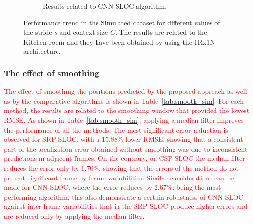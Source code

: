 \documentclass[review]{elsarticle}
\newcommand{\tableref}[1]{Table~\ref{#1}}
\begin{document}
\begin{figure}[t]
\begin{subfigure}{0.45\columnwidth}
%
	\caption{Results related to CNN-SLOC algorithm.}
		\end{subfigure}
	\caption{Performance trend in the Simulated dataset for different values of the stride $s$ and context size $C$. The results are related to the Kitchen room and they have been obtained by using the 1Rx1N architecture.}\label{sfig:cnn-real-context}
	\label{ctx-str-SIMU}
\end{figure}


\subsubsection{The effect of smoothing}
\textcolor{red}{
The effect of smoothing the positions predicted by the proposed approach as well as by the comparative algorithms is shown in \tableref{tab:smooth_sim}. For each method, the results are related to the smoothing window that provided the lowest RMSE. As shown in \tableref{tab:smooth_sim}, applying a median filter improves the performance of all the methods. The most significant error reduction is observed for SRP-SLOC, with a 15.88\% lower RMSE, showing that a consistent part of the localization error obtained without smoothing was due to inconsistent predictions in adjacent frames. On the contrary, on CSP-SLOC the median filter reduces the error only by 1.70\%, showing that the errors of the method do not present significant frame-by-frame variabilities. Similar considerations can be made for CNN-SLOC, where the error reduces by 2.67\%: being the most performing algorithm, this also demonstrate a certain robustness of CNN-SLOC against inter-frame variabilities that in the SRP-SLOC produce higher errors and are reduced only by applying the median filter.}
\end{document}
